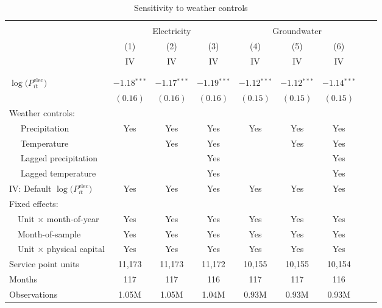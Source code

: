 \begin{table}[t!]\centering
\small
\caption{Sensitivity to weather controls  \label{tab:elec_water_regs_weather}}
\vspace{-0.1cm}
\small
\begin{adjustbox}{center} 
\begin{tabular}{lcccccccc} 
\hline \hline
\vspace{-0.37cm}
\\
 & \multicolumn{3}{c}{Electricity} & \multicolumn{3}{c}{Groundwater} \\
 \cmidrule(r){2-4} \cmidrule(l){5-7}
 & (1)  & (2)  & (3)  & (4)  & (5) & (6)   \\ 
[0.1em]
 & IV & IV & IV & IV & IV & IV  \\
\vspace{-0.37cm}
\\
\cline{2-7}
\vspace{-0.27cm}
\\
 $\log\big(P^{\text{elec}}_{it}\big)$ ~ & $-1.18$$^{***}$  & $-1.17$$^{***}$ & $-1.19$$^{***}$ & $-1.12$$^{***}$ & $-1.12$$^{***}$ & $-1.14$$^{***}$ \\ 
& $(0.16)$ & $(0.16)$ & $(0.16)$ & $(0.15)$ & $(0.15)$ & $(0.15)$  \\
[1.5em] 
Weather controls: \\
[0.1em] 
~~ Precipitation  & Yes & Yes & Yes &  Yes  &  Yes & Yes \\
[0.1em] 
~~ Temperature  & & Yes & Yes & &  Yes  &  Yes \\
[0.1em] 
~~ Lagged precipitation  &  &  & Yes & &  &  Yes \\
[0.1em] 
~~ Lagged temperature   &  &  & Yes & &  &  Yes \\
[1em] 
IV: Default $\log\big(P^{\text{elec}}_{it}\big)$  & Yes & Yes & Yes & Yes &  Yes  &  Yes \\
[1em] 
Fixed effects: \\
[0.1em] 
~~Unit $\times$ month-of-year  & Yes & Yes & Yes & Yes &  Yes  &  Yes  \\ 
[0.1em] 
~~Month-of-sample  & Yes & Yes & Yes & Yes &  Yes  &  Yes   \\ 
[0.1em] 
~~Unit $\times$ physical capital & Yes & Yes & Yes & Yes &  Yes  &  Yes  \\
[1em] 
Service point units & 11,173 & 11,173 & 11,172 & 10,155 & 10,155 & 10,154  \\ 
[0.1em] 
Months  & 117 & 117 & 116 & 117 & 117 & 116  \\ 
[0.1em] 
Observations & 1.05M & 1.05M & 1.04M & 0.93M & 0.93M & 0.93M \\ 

\end{tabular}
\end{adjustbox}
\end{table}
